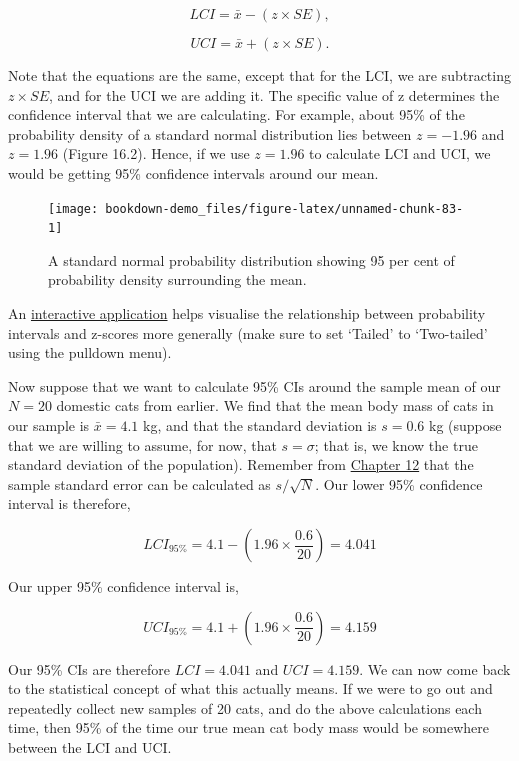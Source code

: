\documentclass[
]{scrbook}
\begin{document}
\[LCI = \bar{x} - (z \times SE),\]

\[UCI = \bar{x} + (z \times SE).\]

Note that the equations are the same, except that for the LCI, we are subtracting \(z \times SE\), and for the UCI we are adding it.
The specific value of z determines the confidence interval that we are calculating.
For example, about 95\% of the probability density of a standard normal distribution lies between \(z = -1.96\) and \(z = 1.96\) (Figure 16.2).
Hence, if we use \(z = 1.96\) to calculate LCI and UCI, we would be getting 95\% confidence intervals around our mean.

\begin{figure}
\texttt{[image: bookdown-demo\_files/figure-latex/unnamed-chunk-83-1]} \caption{A standard normal probability distribution showing 95 per cent of probability density surrounding the mean.}\label{fig:unnamed-chunk-83}
\end{figure}

An \href{https://bradduthie.shinyapps.io/zandp/}{interactive application} helps visualise the relationship between probability intervals and z-scores more generally (make sure to set `Tailed' to `Two-tailed' using the pulldown menu).

Now suppose that we want to calculate 95\% CIs around the sample mean of our \(N = 20\) domestic cats from earlier.
We find that the mean body mass of cats in our sample is \(\bar{x} = 4.1\) kg, and that the standard deviation is \(s = 0.6\) kg (suppose that we are willing to assume, for now, that \(s = \sigma\); that is, we know the true standard deviation of the population).
Remember from \protect\hyperlink{Chapter_12}{Chapter 12} that the sample standard error can be calculated as \(s / \sqrt{N}\).
Our lower 95\% confidence interval is therefore,

\[LCI_{95\%} = 4.1 - \left(1.96 \times \frac{0.6}{20}\right) = 4.041\]

Our upper 95\% confidence interval is,

\[UCI_{95\%} = 4.1 + \left(1.96 \times \frac{0.6}{20}\right) = 4.159\]

Our 95\% CIs are therefore \(LCI = 4.041\) and \(UCI = 4.159\).
We can now come back to the statistical concept of what this actually means.
If we were to go out and repeatedly collect new samples of 20 cats, and do the above calculations each time, then 95\% of the time our true mean cat body mass would be somewhere between the LCI and UCI.
\end{document}
